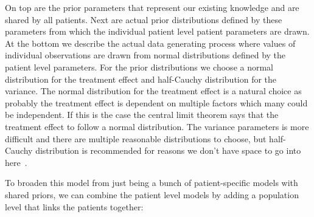 \documentclass[12pt,a4paper,leqno]{report}
\theoremstyle{plain}
\theoremstyle{definition}
\theoremstyle{remark}
\begin{document}
\bigskip


\bigskip

On top are the prior parameters that represent our existing knowledge and are shared by
all patients. Next are actual prior distributions defined by these parameters from which the individual patient
level patient parameters are drawn. At the bottom we describe the actual data generating
process where values of individual observations are drawn from normal distributions
defined by the patient level parameters. For the prior distributions we choose a normal
distribution for the treatment effect and half-Cauchy distribution for the variance. The
normal distribution for the treatment effect is a natural choice as probably the
treatment effect is dependent on multiple factors which many could be independent. If
this is the case the central limit theorem says that the treatment effect to follow a
normal distribution. The variance parameters is more difficult and there are multiple
reasonable distributions to choose, but half-Cauchy distribution is recommended for
reasons we don't have space to go into here\ \cite{variancepriors}.

To broaden this model from just being a bunch
of patient-specific models with shared priors, we can combine the patient level models
by adding a population level that links the patients together:
\end{document}
